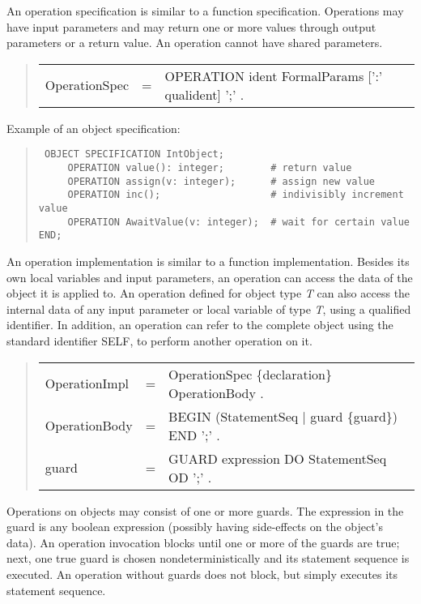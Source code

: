 \documentclass[10pt]{article}
\newenvironment{grammar}
{\begin{quote} \begin{tabular}{p{3.8cm} l l}}
{\end{tabular}\end{quote}}
\begin{document}
An operation specification is similar to
a function specification.
Operations may have input parameters and
may return one or more values through output parameters
or a return value.
An operation cannot have shared parameters.
\begin{grammar}
OperationSpec & = & OPERATION ident FormalParams [':' qualident] ';' .
\end{grammar}
Example of an object specification:
\begin{quote}\tt
OBJECT SPECIFICATION IntObject; \\
\mbox{~~~~~}OPERATION value():~integer;~~~~~~~~\# return value \\
\mbox{~~~~~}OPERATION assign(v:~integer);~~~~~~\# assign new value \\
\mbox{~~~~~}OPERATION inc();~~~~~~~~~~~~~~~~~~~\# indivisibly increment value \\
\mbox{~~~~~}OPERATION AwaitValue(v:~integer);~~\# wait for certain value \\
END;
\end{quote}

An operation implementation is similar to a function implementation.
Besides its own local variables and input parameters,
an operation can access the data of the object it is applied to.
An operation defined for object type {\em T} can also access the internal data
of any input parameter or local variable of type {\em T}, using a qualified
identifier.
In addition, an operation can refer to the complete object using the
standard identifier SELF, to perform another operation on it.
\begin{grammar}
OperationImpl & = & OperationSpec \{declaration\} OperationBody . \\
OperationBody & = & BEGIN (StatementSeq $|$ guard \{guard\}) END ';' . \\
guard & = & GUARD expression DO StatementSeq OD ';' .
\end{grammar}

Operations on objects may consist of one or more guards.
The expression in the guard is any boolean expression (possibly having
side-effects on the object's data).
An operation invocation blocks until one or more of the guards
are true; next, one true guard is chosen nondeterministically and its
statement sequence is executed.
An operation without guards does not block, but simply executes its
statement sequence.
\end{document}
